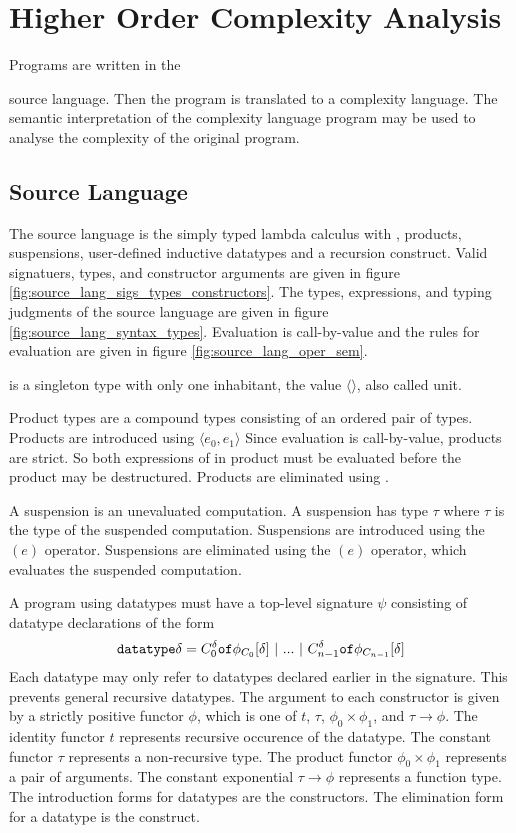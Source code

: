 \chapter{Higher Order Complexity Analysis}

Programs are written in the {source language. Then the program is translated
to a complexity language. The semantic interpretation of the complexity
language program may be used to analyse the complexity of the original
program.

\section{Source Language}
The source language is the simply typed lambda calculus with ,
products, suspensions, user-defined inductive datatypes and a recursion
construct.  Valid signatuers, types, and constructor arguments are given in
figure \ref{fig:source_lang_sigs_types_constructors}. The types, expressions,
and typing judgments of the source language are given in figure
\ref{fig:source_lang_syntax_types}.  Evaluation is call-by-value and the rules
for evaluation are given in figure \ref{fig:source_lang_oper_sem}.

 is a singleton type with only one inhabitant, the value
$\langle\rangle$, also called unit. 

Product types are a compound types consisting of an ordered pair of types.
Products are introduced using $\langle e_0, e_1 \rangle$ Since evaluation is
call-by-value, products are strict.  So both expressions of in product must be
evaluated before the product may be destructured.  Products are eliminated
using .

A suspension is an unevaluated computation.  A suspension has type 
$\tau$ where $\tau$ is the type of the suspended computation.  Suspensions are
introduced using the $(e)$ operator.  Suspensions are eliminated using
the $(e)$ operator, which evaluates the suspended computation.


A program using datatypes must have a top-level signature $\psi$ consisting of
datatype declarations of the form
%
\[ \texttt{datatype} \delta = C^\delta_0 \texttt{of} \phi_{C_0}[\delta] \ |\ ...\ |\ C^\delta_{n-1} \texttt{of} \phi_{C_{n-1}}[\delta] \]
%
Each datatype may only refer to datatypes declared earlier in the signature.
This prevents general recursive datatypes.  The argument to each constructor is
given by a strictly positive functor $\phi$, which is one of $t$, $\tau$,
$\phi_0 \times \phi_1$, and $\tau \rightarrow \phi$.  The identity functor $t$
represents recursive occurence of the datatype.  The constant functor $\tau$
represents a non-recursive type.  The product functor $\phi_0 \times \phi_1$
represents a pair of arguments.  The constant exponential $\tau \rightarrow \phi$
represents a function type.  The introduction forms for datatypes are the
constructors.  The elimination form for a datatype is the  construct.


}
